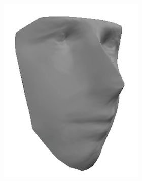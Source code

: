 \begin{figure}
\begin{subfigure}{0.23\textwidth}
        \includegraphics[width=\textwidth]{statistical_normals/images/gsfs_results/celebrities/tom_cruise_spherical.png}
\label{fig:tom-cruise-no-texture}
    \end{subfigure}
    \begin{subfigure}{0.23\textwidth}
        \centering

\end{subfigure}
\end{figure}
